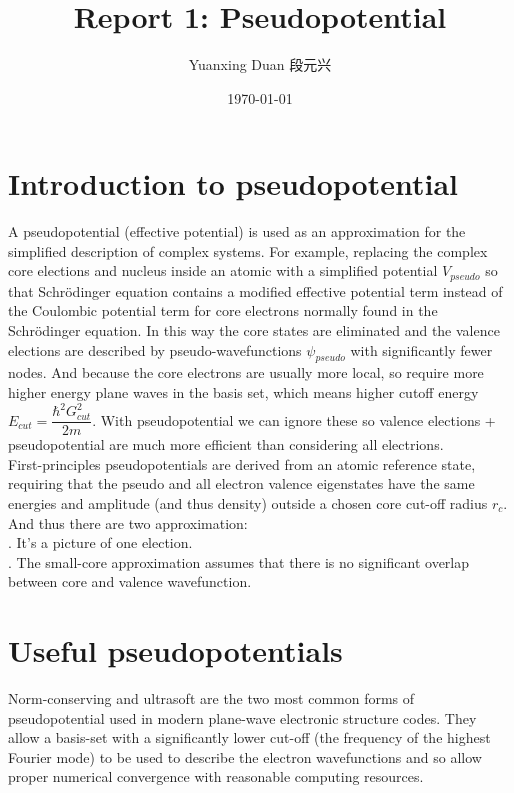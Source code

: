 \documentclass[UTF8]{ctexart}
\title{Report 1: Pseudopotential}
\author{Yuanxing Duan 段元兴}
\date{\today}
\begin{document}
\maketitle
\thispagestyle{empty}
\setcounter{page}{1}
\newpage
\tableofcontents
\newpage
    \section{Introduction to pseudopotential}
        \indent A pseudopotential (effective potential) is used as an approximation for the simplified description
        of complex systems. For example, replacing the complex core elections and nucleus inside an atomic with a
        simplified potential $V_{pseudo}$ so that Schrödinger equation contains a modified effective potential term
        instead of the Coulombic potential term for core electrons normally found in the Schrödinger equation. In
        this way the core states are eliminated and the valence elections are described by pseudo-wavefunctions $\psi_{pseudo}$
        with significantly fewer nodes. And because the core electrons are usually more local, so require more
        higher energy plane waves in the basis set, which means higher cutoff energy $E_{cut}=\dfrac{\hbar^2G_{cut}^2}{2m}$.
        With pseudopotential we can ignore these so valence elections + pseudopotential are much more efficient than
        considering all electrions.\\
        First-principles pseudopotentials are derived from an atomic reference state, requiring that the pseudo and all
        electron valence eigenstates have the same energies and amplitude (and thus density) outside a chosen core cut-off
        radius $r_c$. And thus there are two approximation:\\
        . It's a picture of one election.\\
        . The small-core approximation assumes that there is no significant overlap between core and valence wavefunction.\\
    \section{Useful pseudopotentials}
        \indent Norm-conserving and ultrasoft are the two most common forms of pseudopotential used in modern plane-wave electronic
        structure codes. They allow a basis-set with a significantly lower cut-off (the frequency of the highest Fourier mode) to be
        used to describe the electron wavefunctions and so allow proper numerical convergence with reasonable computing resources.
\end{document}
